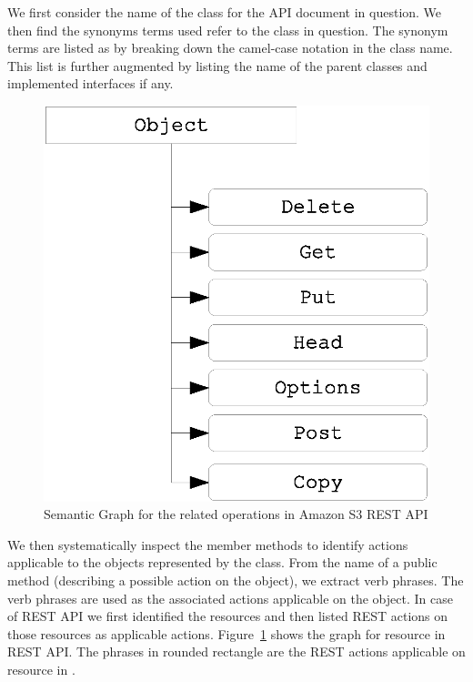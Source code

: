 We first consider the name of the class for the API document in question.
We then find the synonyms terms used refer to the class in question.
The synonym terms are listed as by breaking down the camel-case notation in the class name.
This list is further augmented by listing the name of the parent classes and implemented interfaces if any. 

\begin{figure}
	\centering
		\includegraphics[scale=0.4]{KnowledgeGraph.eps}
	\caption{Semantic Graph for the  related operations in Amazon S3 REST API}
	\label{fig:knowledge}
\end{figure} 

We then systematically inspect the member methods to identify actions applicable to the objects represented by the class. From the name of a public method (describing a possible action on the object), we extract verb phrases. The verb phrases are used as the associated actions applicable on the object. In case of REST API we first identified the resources and then listed REST actions on those resources as applicable actions. Figure~\ref{fig:knowledge} shows the graph for  resource in REST API. The phrases in rounded rectangle are the REST actions applicable on  resource in \amazonAPI.
  

